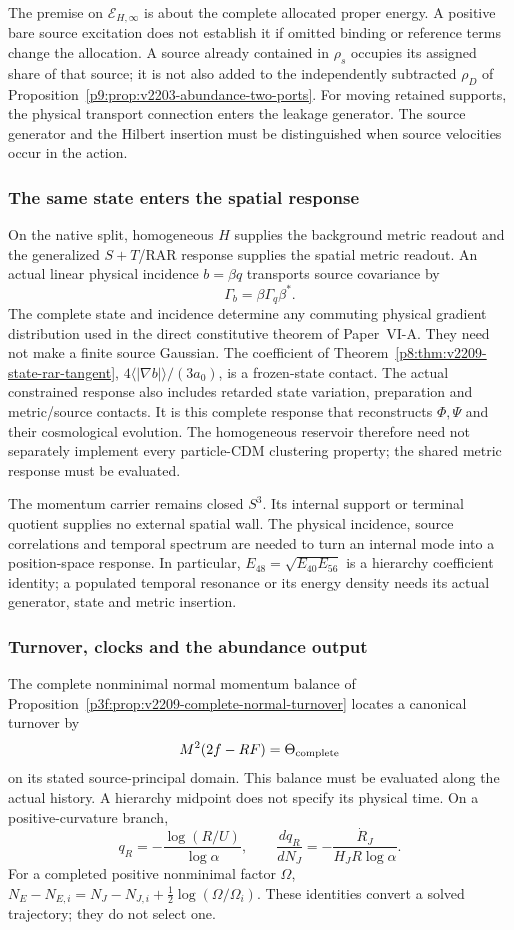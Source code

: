 \documentclass[12pt,a4paper]{article}
\begin{document}
The premise on \(\mathcal E_{H,\infty}\) is about the complete allocated
proper energy. A positive bare source excitation does not establish it
if omitted binding or reference terms change the allocation. A source
already contained in \(\rho_s\) occupies its assigned share of that
source; it is not also added to the independently subtracted
\(\rho_D\) of Proposition~\ref{p9:prop:v2203-abundance-two-ports}.
For moving retained supports, the physical transport connection enters
the leakage generator. The source generator and the Hilbert insertion
must be distinguished when source velocities occur in the action.

\subsubsection{The same state enters the spatial response}
On the native split, homogeneous \(H\) supplies the background metric
readout and the generalized \(S+T\)/RAR response supplies the spatial
metric readout. An actual linear physical incidence \(b=\beta q\)
transports source covariance by
\[
 \Gamma_b=\beta\Gamma_q\beta^*.
\]
The complete state and incidence determine any commuting physical
gradient distribution used in the direct constitutive theorem of
Paper~VI-A. They need not make a finite source Gaussian.
The coefficient of Theorem~\ref{p8:thm:v2209-state-rar-tangent},
\(4\langle|\nabla b|\rangle/(3a_0)\), is a frozen-state
contact. The actual constrained response also includes retarded state
variation, preparation and metric/source contacts. It is this complete
response that reconstructs \(\Phi,\Psi\) and their cosmological evolution.
The homogeneous reservoir therefore need not separately implement
every particle-CDM clustering property; the shared metric response must
be evaluated.

The momentum carrier remains closed \(S^3\). Its internal support or
terminal quotient supplies no external spatial wall. The physical
incidence, source correlations and temporal spectrum are needed to turn
an internal mode into a position-space response. In particular,
\(E_{48}=\sqrt{E_{40}E_{56}}\) is a hierarchy coefficient identity; a
populated temporal resonance or its energy density needs its actual
generator, state and metric insertion.

\subsubsection{Turnover, clocks and the abundance output}
The complete nonminimal normal momentum balance of
Proposition~\ref{p3f:prop:v2209-complete-normal-turnover} locates
a canonical turnover by
\[
 M^2(2f-RF)=\Theta_{\rm complete}
\]
on its stated source-principal domain. This balance must be evaluated
along the actual history. A hierarchy midpoint does not specify its
physical time. On a positive-curvature branch,
\[
 q_R=-\frac{\log(R/U)}{\log\alpha},\qquad
 \frac{dq_R}{dN_J}=-\frac{\dot R_J}{H_JR\log\alpha}.
\]
For a completed positive nonminimal factor \(\Omega\),
\(N_E-N_{E,i}=N_J-N_{J,i}+\frac12\log(\Omega/\Omega_i)\).
These identities convert a solved trajectory; they do not select one.
\end{document}
